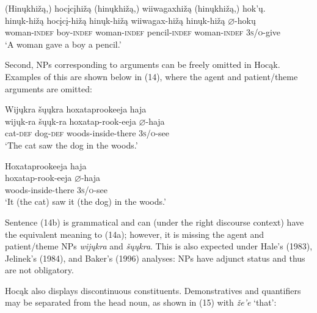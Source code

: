 \documentclass[output=paper]{LSP/langsci}
\begin{document}
\begin{exe}
\ex 
\glll (Hin\k{u}khi\v{z}\k{a},) 	hoc\k{i}c\k{i}hi\v{z}\k{a} 	(hin\k{u}khi\v{z}\k{a},) wiiwagaxhi\v{z}\k{a} 	(hin\k{u}khi\v{z}\k{a},) hok'\k{u}.\\
hin\k{u}k-hi\v{z}\k{a} 		hoc\k{i}c\k{i}-hi\v{z}\k{a} 	hin\k{u}k-hi\v{z}\k{a} 		wiiwagax-hi\v{z}\k{a} 	hin\k{u}k-hi\v{z}\k{a} 	$\varnothing$-hok\k{u} \\
	woman-\textsc{indef}	boy-\textsc{indef} 	woman-\textsc{indef} 	pencil-\textsc{indef} 	woman-\textsc{indef} 	\textsc{3s/o}-give \\
\trans `A woman gave a boy a pencil.'
\end{exe}
	
Second, NPs corresponding to arguments can be freely omitted in Hoc\k{a}k. Examples of this are shown below in (14), where the agent and patient/theme arguments are omitted:

\begin{exe}
\ex
\begin{xlist}
\ex 
\glll Wij\k{u}kra	\v{s}\k{u}\k{u}kra		hoxataprookeeja 		haja\\
wij\k{u}k-ra	\v{s}\k{u}\k{u}k-ra	hoxatap-rook-eeja 	$\varnothing$-haja \\
	cat-\textsc{def} 	dog-\textsc{def} 	woods-inside-there 	\textsc{3s/o}-see \\
\trans `The cat saw the dog in the woods.'

\ex 
\glll Hoxataprookeeja haja \\
hoxatap-rook-eeja 	$\varnothing$-haja \\
woods-inside-there \textsc{3s/o}-see \\
\trans `It (the cat) saw it (the dog) in the woods.'
\end{xlist}
\end{exe}

Sentence (14b) is grammatical and can (under the right discourse context) have the equivalent meaning to (14a); however, it is missing the agent and patient/theme NPs \textit{wij\k{u}kra} and \textit{\v{s}\k{u}\k{u}kra}. This is also expected under Hale's (1983), Jelinek's (1984), and Baker's (1996) analyses: NPs have adjunct status and thus are not obligatory.

Hoc\k{a}k also displays discontinuous constituents. Demonstratives and quantifiers may be separated from the head noun, as shown in (15) with \textit{\v{z}e'e} `that': 
\end{document}
